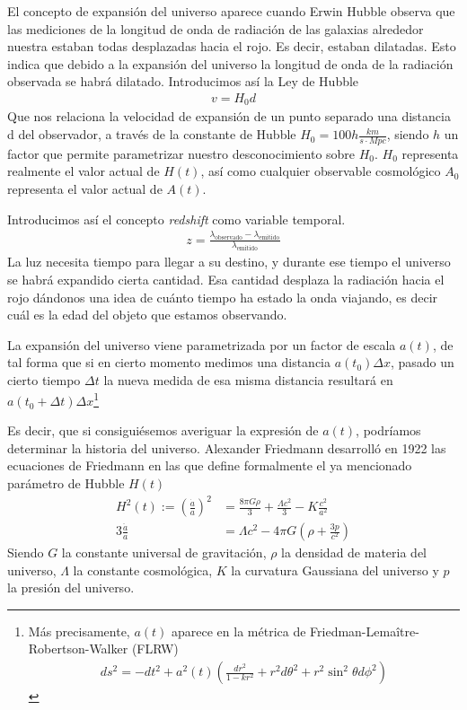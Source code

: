 El concepto de expansión del universo aparece cuando Erwin Hubble observa que las mediciones de la longitud de onda de radiación de las galaxias alrededor nuestra estaban todas desplazadas hacia el rojo. Es decir, estaban dilatadas. Esto indica que debido a la expansión del universo la longitud de onda de la radiación observada se habrá dilatado. Introducimos así la Ley de Hubble 
\begin{align}
	v = H_0 d
	\label{eq:ley-hubble}
\end{align}
Que nos relaciona la velocidad de expansión de un punto separado una distancia d del observador, a través de la constante de Hubble $H_0 = 100h \frac{km}{s \cdot Mpc}$, siendo $h$ un factor que permite parametrizar nuestro desconocimiento sobre $H_0$. $H_0$ representa realmente el valor actual de $H(t)$, así como cualquier observable cosmológico $A_0$ representa el valor actual de $A(t)$. 

Introducimos así el concepto \textit{redshift} como variable temporal.
\begin{align}
	z = \frac{\lambda_{\text{observado}} - \lambda_{\text{emitido}}}{\lambda_{\text{emitido}}}
	\label{eq:redshift}
\end{align}
La luz necesita tiempo para llegar a su destino, y durante ese tiempo el universo se habrá expandido cierta cantidad. Esa cantidad desplaza la radiación hacia el rojo dándonos una idea de cuánto tiempo ha estado la onda viajando, es decir cuál es la edad del objeto que estamos observando.

La expansión del universo viene parametrizada por un factor de escala $a(t)$, de tal forma que si en cierto momento medimos una distancia $a(t_0)\Delta x$, pasado un cierto tiempo $\Delta t$ la nueva medida de esa misma distancia resultará en $a(t_0+\Delta t) \Delta x$\footnote{Más precisamente, $a(t)$ aparece en la métrica de Friedman-Lemaître-Robertson-Walker (FLRW) 
\begin{align}
	ds^{2} = -dt ^{2} + a^{2}(t) \left( \frac{dr^{2}}{1-kr^2} + r^2d\theta^2 + r^2 \sin ^2 \theta d\phi^2\right) 
\end{align}}

Es decir, que si consiguiésemos averiguar la expresión de $a(t)$, podríamos determinar la historia del universo. Alexander Friedmann desarrolló en 1922 las ecuaciones de Friedmann en las que define formalmente el ya mencionado parámetro de Hubble $H(t)$
\begin{align}
	H^2(t) := \left( \frac{\dot a}{a} \right)^2 &=  \frac{8\pi G \rho}{3} +\frac{  \Lambda c^2}{3} - K \frac{c^2}{a^2}
	\label{eq:1a-friedmann}\\
	3 \frac{\ddot a}{a} &= \Lambda c^2 - 4\pi G \left( \rho + \frac{3p}{c^2} \right) 
	\label{eq:2a-friedmann}
\end{align}
Siendo  $G$ la constante universal de gravitación, $\rho$ la densidad de materia del universo, $\Lambda$ la constante cosmológica, $K$ la curvatura Gaussiana del universo y  $p$ la presión del universo.

